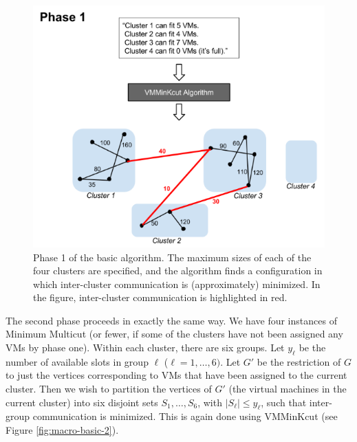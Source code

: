 \documentclass[11pt]{article}
\begin{document}
\begin{figure}
  \centering
\includegraphics[scale=0.7]{phase1.png}

 \caption{Phase 1 of the basic algorithm.  The maximum sizes of each of the four clusters are specified, and the algorithm finds a configuration in which inter-cluster communication is (approximately) minimized.  In the figure, inter-cluster communication is highlighted in red.}
 
 \label{fig:macro-basic-1}
\end{figure}

The second phase proceeds in exactly the same way.  We have four instances of Minimum Multicut (or fewer, if some of the clusters have not been assigned any VMs by phase one).  Within each cluster, there are six groups.  Let $y_\ell$ be the number of available slots in group $\ell$ ($\ell = 1,\ldots,6)$.  Let $G'$ be the restriction of $G$ to just the vertices corresponding to VMs that have been assigned to the current cluster.  Then we wish to partition the vertices of $G'$ (the virtual machines in the current cluster) into six disjoint sets $S_1, \ldots, S_6$, with $|S_\ell| \leq y_\ell$, such that inter-group communication is minimized.  This is again done using VMMinKcut (see Figure \ref{fig:macro-basic-2}).
\end{document}
